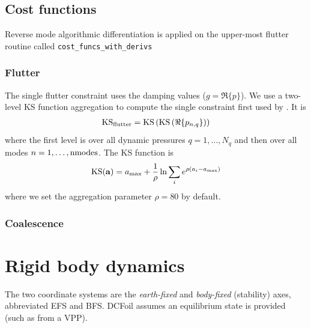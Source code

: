 \documentclass[10pt]{article}
\newcommand{\mbf}[1]{\mathbf{#1}}
\newcommand{\be}{\begin{eqnarray}}
\newcommand{\ee}{\end{eqnarray}}
\newcommand{\tn}[1]{\textnormal{#1}}
\begin{document}
\subsection{Cost functions}
% 
Reverse mode algorithmic differentiation is applied on the upper-most flutter routine called \texttt{cost\_funcs\_with\_derivs}

\subsubsection{Flutter}
% 
The single flutter constraint uses the damping values ($g = \Re\{p\}$).
We use a two-level KS function aggregation to compute the single constraint first used by \citet{Jonsson2017a}.
It is
%
\be
\label{eqn:KS}
\tn{KS}_{\tn{flutter}} = \tn{KS}\left(\tn{KS} \left( \Re\{p_{n,q}\} \right)\right)
\ee
%
where the first level is over all dynamic pressures $q = 1,\dots,N_q$ and then over all modes $n = 1,\dots,\tn{nmodes}$.
The KS function is
\be
\tn{KS}(\mbf{a}) = a_{\tn{max}} + \frac{1}{\rho}  \ln \sum_i e^{\rho \left( a_i - a_{\tn{max}}\right)}
\ee
where we set the aggregation parameter $\rho=80$ by default.


\subsubsection{Coalescence}

\section{Rigid body dynamics}
% 
The two coordinate systems are the \emph{earth-fixed} and \emph{body-fixed} (stability) axes, abbreviated EFS and BFS.
DCFoil assumes an equilibrium state is provided (such as from a VPP).
% 
\end{document}
